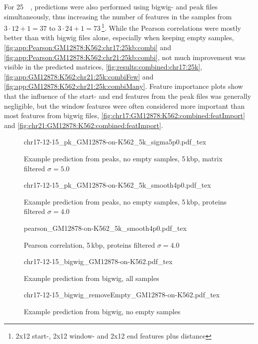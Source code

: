 For \SI{25}{\kilo\bp}, predictions were also performed using bigwig- and peak files simultaneously,
thus increasing the number of features in the samples from $3\cdot12+1=37$ to $3\cdot24+1=73\,$\footnote{2x12 start-, 2x12 window- and 2x12 end features plus 
distance}.
While the Pearson correlations were mostly better than with bigwig files alone, especially when keeping empty 
samples, \autoref{fig:app:Pearson:GM12878:K562:chr17:25kb:combi} and \ref{fig:app:Pearson:GM12878:K562:chr21:25kb:combi},
not much improvement was visible in the predicted matrices, \autoref{fig:results:combined:chr17:25k}, \ref{fig:app:GM12878:K562:chr21:25k:combiFew} and 
\ref{fig:app:GM12878:K562:chr21:25k:combiMany}.
Feature importance plots show that the influence of the start- and end features from the peak files was generally negligible, 
but the window features were often considered more important than most features from 
bigwig files, \autoref{fig:chr17:GM12878:K562:combined:featImport} and \ref{fig:chr21:GM12878:K562:combined:featImport}.
\begin{figure}[hp]
 \centering
 \scriptsize
 {chr17-12-15_pk_GM12878-on-K562_5k_sigma5p0.pdf_tex}
 \caption{Example prediction from peaks, no empty samples, 5\,kbp, matrix filtered $\sigma=5.0$}
 \label{fig:results:pk:smoothened:5k}
\end{figure}
\begin{figure}[hp]
 \centering
 \scriptsize
 {chr17-12-15_pk_GM12878-on-K562_5k_smooth4p0.pdf_tex}
 \caption{Example prediction from peaks, no empty samples, 5\,kbp, proteins filtered $\sigma=4.0$}
 \label{fig:results:pk:sigma4p0:5k}
\end{figure}
\begin{figure}[hp]
 \centering
 \scriptsize
 {pearson_GM12878-on-K562_5k_smooth4p0.pdf_tex}
 \caption{Pearson correlation, 5\,kbp, proteins filtered $\sigma=4.0$}
 \label{fig:results:pk:Pearson:sigma4p0:5k}
\end{figure}
\begin{figure}[hp]
 \centering
 \scriptsize
 {chr17-12-15_bigwig_GM12878-on-K562.pdf_tex}
 \caption{Example prediction from bigwig, all samples}
 \label{fig:results:bigwig:allsamples}
\end{figure}
\begin{figure}[hp]
 \centering
 \scriptsize
 {chr17-12-15_bigwig_removeEmpty_GM12878-on-K562.pdf_tex}
 \caption{Example prediction from bigwig, no empty samples}
 \label{fig:results:bigwig:noemptysamples}
\end{figure}
